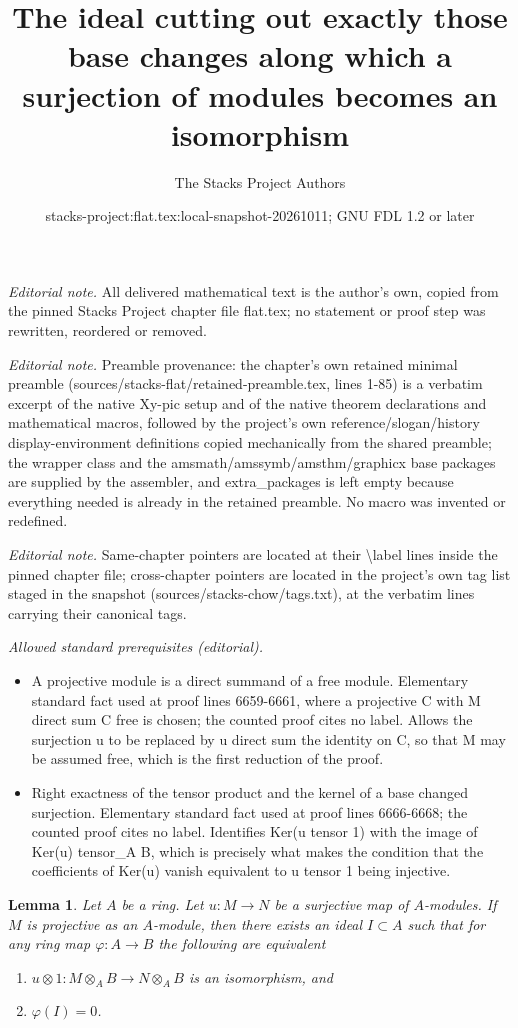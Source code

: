 \documentclass[10pt,a4paper]{amsart}
\title{The ideal cutting out exactly those base changes along which a surjection of modules becomes an isomorphism}
\author{The Stacks Project Authors}
\date{stacks-project:flat.tex:local-snapshot-20261011; GNU FDL 1.2 or later}
\theoremstyle{plain}
\newtheorem{lemma}[subsection]{Lemma}
\theoremstyle{definition}
\theoremstyle{remark}
\numberwithin{equation}{subsection}
\begin{document}
\maketitle
\noindent\textit{Editorial note.} All delivered mathematical text is the author's own, copied from the pinned Stacks Project chapter file flat.tex; no statement or proof step was rewritten, reordered or removed.\par\medskip
\noindent\textit{Editorial note.} Preamble provenance: the chapter's own retained minimal preamble (sources/stacks-flat/retained-preamble.tex, lines 1-85) is a verbatim excerpt of the native Xy-pic setup and of the native theorem declarations and mathematical macros, followed by the project's own reference/slogan/history display-environment definitions copied mechanically from the shared preamble; the wrapper class and the amsmath/amssymb/amsthm/graphicx base packages are supplied by the assembler, and extra\_packages is left empty because everything needed is already in the retained preamble. No macro was invented or redefined.\par\medskip
\noindent\textit{Editorial note.} Same-chapter pointers are located at their \textbackslash{}label lines inside the pinned chapter file; cross-chapter pointers are located in the project's own tag list staged in the snapshot (sources/stacks-chow/tags.txt), at the verbatim lines carrying their canonical tags.\par\medskip
\noindent\textit{Allowed standard prerequisites (editorial).}\begin{itemize}
\item A projective module is a direct summand of a free module. Elementary standard fact used at proof lines 6659-6661, where a projective C with M direct sum C free is chosen; the counted proof cites no label. Allows the surjection u to be replaced by u direct sum the identity on C, so that M may be assumed free, which is the first reduction of the proof.
\item Right exactness of the tensor product and the kernel of a base changed surjection. Elementary standard fact used at proof lines 6666-6668; the counted proof cites no label. Identifies Ker(u tensor 1) with the image of Ker(u) tensor\_A B, which is precisely what makes the condition that the coefficients of Ker(u) vanish equivalent to u tensor 1 being injective.
\end{itemize}\medskip
\begin{lemma}
\label{lemma-flattening-module-map}
Let $A$ be a ring. Let $u : M \to N$ be a surjective map of $A$-modules.
If $M$ is projective as an $A$-module, then there exists an ideal
$I \subset A$ such that for any ring map $\varphi : A \to B$
the following are equivalent
\begin{enumerate}
\item $u \otimes 1 : M \otimes_A B \to N \otimes_A B$ is an
isomorphism, and
\item $\varphi(I) = 0$.
\end{enumerate}
\end{lemma}
\end{document}
